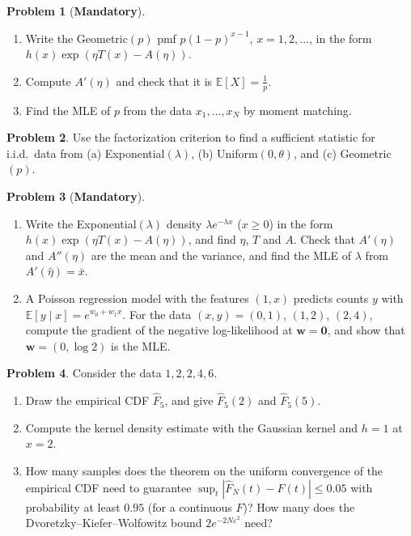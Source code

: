 \documentclass[11pt]{article}
\theoremstyle{definition}
\newtheorem{problem}{Problem}[section]
\newcommand{\mandatory}{\textcolor{red!70!black}{\textbf{Mandatory}}}
\newcommand{\E}{\mathbb{E}}
\begin{document}
\begin{problem}[\mandatory]\label{pr:expfam-practice}
    \begin{enumerate}[label=(\alph*)]
        \item Write the Geometric$(p)$ pmf $p(1 - p)^{x - 1}$, $x = 1, 2, \ldots$, in the form $h(x)\exp(\eta T(x) - A(\eta))$.
        \item Compute $A'(\eta)$ and check that it is $\E[X] = \frac{1}{p}$.
        \item Find the MLE of $p$ from the data $x_1, \ldots, x_N$ by moment matching.
    \end{enumerate}
\end{problem}

\begin{problem}\label{pr:factorization-practice}
    Use the factorization criterion to find a sufficient statistic for i.i.d.\ data from (a) Exponential$(\lambda)$, (b) Uniform$(0, \theta)$, and (c) Geometric$(p)$.
\end{problem}

\begin{problem}[\mandatory]\label{pr:exp-family}
    \begin{enumerate}[label=(\alph*)]
        \item Write the Exponential$(\lambda)$ density $\lambda e^{-\lambda x}$ ($x \geq 0$) in the form $h(x)\exp(\eta T(x) - A(\eta))$, and find $\eta$, $T$ and $A$. Check that $A'(\eta)$ and $A''(\eta)$ are the mean and the variance, and find the MLE of $\lambda$ from $A'(\hat\eta) = \bar x$.
        \item A Poisson regression model with the features $(1, x)$ predicts counts $y$ with $\E[y \mid x] = e^{w_0 + w_1x}$. For the data $(x, y) = (0, 1)$, $(1, 2)$, $(2, 4)$, compute the gradient of the negative log-likelihood at $\mathbf{w} = \mathbf{0}$, and show that $\mathbf{w} = (0, \log 2)$ is the MLE.
    \end{enumerate}
\end{problem}

\begin{problem}\label{pr:ecdf-kde}
    Consider the data $1, 2, 2, 4, 6$.
    \begin{enumerate}[label=(\alph*)]
        \item Draw the empirical CDF $\hat F_5$, and give $\hat F_5(2)$ and $\hat F_5(5)$.
        \item Compute the kernel density estimate with the Gaussian kernel and $h = 1$ at $x = 2$.
        \item How many samples does the theorem on the uniform convergence of the empirical CDF need to guarantee $\sup_t |\hat F_N(t) - F(t)| \leq 0.05$ with probability at least $0.95$ (for a continuous $F$)? How many does the Dvoretzky--Kiefer--Wolfowitz bound $2e^{-2N\varepsilon^2}$ need?
    \end{enumerate}
\end{problem}
\end{document}
